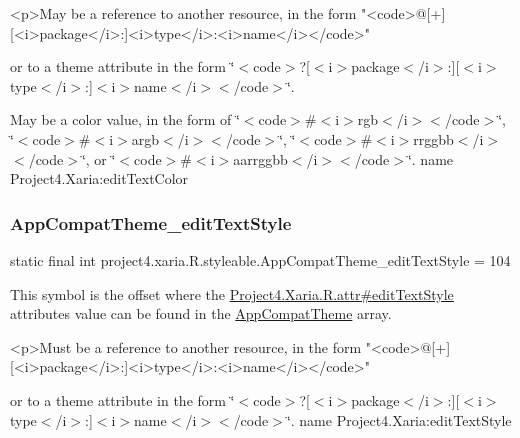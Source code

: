 \begin{DoxyVerb}      <p>May be a reference to another resource, in the form "<code>@[+][<i>package</i>:]<i>type</i>:<i>name</i></code>"
\end{DoxyVerb}
 or to a theme attribute in the form \char`\"{}$<$code$>$?\mbox{[}$<$i$>$package$<$/i$>$\+:\mbox{]}\mbox{[}$<$i$>$type$<$/i$>$\+:\mbox{]}$<$i$>$name$<$/i$>$$<$/code$>$\char`\"{}. 

May be a color value, in the form of \char`\"{}$<$code$>$\#$<$i$>$rgb$<$/i$>$$<$/code$>$\char`\"{}, \char`\"{}$<$code$>$\#$<$i$>$argb$<$/i$>$$<$/code$>$\char`\"{}, \char`\"{}$<$code$>$\#$<$i$>$rrggbb$<$/i$>$$<$/code$>$\char`\"{}, or \char`\"{}$<$code$>$\#$<$i$>$aarrggbb$<$/i$>$$<$/code$>$\char`\"{}.  name Project4.\+Xaria\+:edit\+Text\+Color \mbox{\label{classproject4_1_1xaria_1_1R_1_1styleable_a9d7977c472c0684d034633f96e9590ef}} 
\subsubsection{\texorpdfstring{App\+Compat\+Theme\+\_\+edit\+Text\+Style}{AppCompatTheme\_editTextStyle}}
{\footnotesize\ttfamily static final int project4.\+xaria.\+R.\+styleable.\+App\+Compat\+Theme\+\_\+edit\+Text\+Style = 104\hspace{0.3cm}{\ttfamily [static]}}

This symbol is the offset where the \hyperlink{}{Project4.\+Xaria.\+R.\+attr\#edit\+Text\+Style} attribute\textquotesingle{}s value can be found in the \hyperlink{classproject4_1_1xaria_1_1R_1_1styleable_aad8bec413e2350f9404e6ff0e831a85d}{App\+Compat\+Theme} array.

\begin{DoxyVerb}      <p>Must be a reference to another resource, in the form "<code>@[+][<i>package</i>:]<i>type</i>:<i>name</i></code>"
\end{DoxyVerb}
 or to a theme attribute in the form \char`\"{}$<$code$>$?\mbox{[}$<$i$>$package$<$/i$>$\+:\mbox{]}\mbox{[}$<$i$>$type$<$/i$>$\+:\mbox{]}$<$i$>$name$<$/i$>$$<$/code$>$\char`\"{}.  name Project4.\+Xaria\+:edit\+Text\+Style \mbox{\label{classproject4_1_1xaria_1_1R_1_1styleable_a9ff6722d4ca5847217d1afa321456b6e}} 
